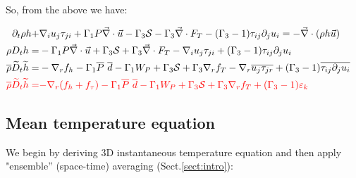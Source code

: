 \documentclass[10pt,paper=a4]{report}
\newcommand{\eht}{\overline}
\newcommand{\fht}{\widetilde}
\begin{document}
So, from the above we have:

\begin{align}
\partial_t \rho h + & \nabla_i u_j \tau_{ji} + \Gamma_1 P \vec{\nabla} \cdot \vec{u} - \Gamma_3 {\mathcal S} - \Gamma_3 \vec{\nabla} \cdot F_T - (\Gamma_3 -1) \tau_{ij}\partial_j u_i = -\vec{\nabla} \cdot (\rho h \vec{u}) & \\
\rho D_t h = & -\Gamma_1 P \vec{\nabla} \cdot \vec{u} + \Gamma_3 {\mathcal S} + \Gamma_3 \vec{\nabla} \cdot F_T - \nabla_i u_j \tau_{ji} +  (\Gamma_3 -1) \tau_{ij}\partial_j u_i \\
\eht{\rho}\fht{D}_t \fht{h} = & -\nabla_r f_h - \Gamma_1\eht{P} \ \eht{d} - \Gamma_1 W_P + \Gamma_3 {\mathcal S} + \Gamma_3 \nabla_r f_T - \nabla_r \eht{u_j \tau_{jr}} +  (\Gamma_3 -1) \eht{\tau_{ij}\partial_j u_i} \\
{\color{red} \eht{\rho}\fht{D}_t \fht{h} =} & {\color{red}-\nabla_r (f_h + f_\tau) - \Gamma_1\eht{P} \ \eht{d} - \Gamma_1 W_P + \Gamma_3 {\mathcal S} + \Gamma_3 \nabla_r f_T +  (\Gamma_3 -1)\varepsilon_k}  
\end{align}

\fontsize{12pt}{20pt}


\subsection{Mean temperature equation}

We begin by deriving 3D instantaneous temperature equation and then apply "ensemble'' (space-time) averaging (Sect.\ref{sect:intro}):

\fontsize{9pt}{20pt}
\end{document}
